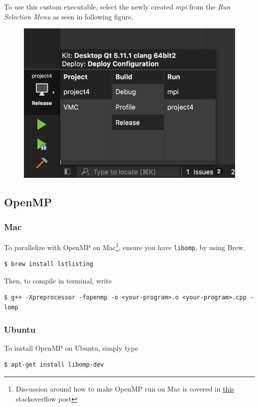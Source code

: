 \documentclass[11pt]{article}
\begin{document}
To use this custom executable, select the newly created \textit{mpi} from the \textit{Run Selection Menu} as seen in following figure,
\begin{figure}[H]
    \centering
    \includegraphics[width=\textwidth]{figures/mpi/qt_run_selection.png}
\end{figure}



\subsection{OpenMP}
\subsubsection{Mac}
To parallelize with OpenMP on Mac\footnote{Discussion around how to make OpenMP run on Mac is covered in \href{https://stackoverflow.com/questions/39979836/using-openmp-with-c11-on-mac-os}{this} stackoverflow post}, ensure you have \texttt{libomp}, by using Brew.
\begin{lstlisting}
$ brew install lstlisting
\end{lstlisting}
Then, to compile in terminal, write
\begin{lstlisting}
$ g++ -Xpreprocessor -fopenmp -o <your-program>.o <your-program>.cpp -lomp
\end{lstlisting}
\subsubsection{Ubuntu}
To install OpenMP on Ubuntu, simply type
\begin{lstlisting}
$ apt-get install libomp-dev
\end{lstlisting}
\end{document}
